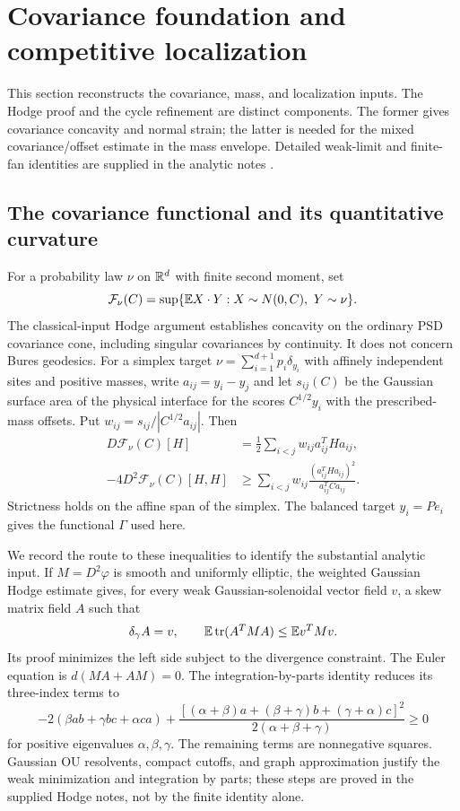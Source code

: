 \section{Covariance foundation and competitive localization}
\label{sec:foundation-proof}
This section reconstructs the covariance, mass, and localization inputs.
The Hodge proof and the cycle refinement are distinct components. The
former gives covariance concavity and normal strain; the latter is needed
for the mixed covariance/offset estimate in the mass envelope. Detailed
weak-limit and finite-fan identities are supplied in the analytic notes
\cite{hodge,cycle,currentassembly}.

\subsection{The covariance functional and its quantitative curvature}
For a probability law $\nu$ on $\mathbb R^d$ with finite second moment, set
\[
 \mathcal F_\nu(C)=\sup\{\mathbb E X\cdot Y:X\sim N(0,C),\ Y\sim\nu\}.
\]
The classical-input Hodge argument \cite{hodge} establishes concavity
on the ordinary PSD covariance cone, including singular covariances by
continuity. It does not concern Bures geodesics. For a simplex target
$\nu=\sum_{i=1}^{d+1}p_i\delta_{y_i}$ with affinely independent sites and
positive masses, write $a_{ij}=y_i-y_j$ and let $s_{ij}(C)$ be the Gaussian
surface area of the physical interface for the scores $C^{1/2}y_i$ with
the prescribed-mass offsets. Put $w_{ij}=s_{ij}/|C^{1/2}a_{ij}|$. Then
\begin{align}
 D\mathcal F_\nu(C)[H]&=\frac12\sum_{i<j}w_{ij}a_{ij}^THa_{ij},
       \label{eq:hodge-derivative}\\
 -4D^2\mathcal F_\nu(C)[H,H]
 &\ge\sum_{i<j}w_{ij}\frac{(a_{ij}^THa_{ij})^2}{a_{ij}^TCa_{ij}}.
       \label{eq:hodge-strain}
\end{align}
Strictness holds on the affine span of the simplex. The balanced target
$y_i=Pe_i$ gives the functional $\Gamma$ used here.

We record the route to these inequalities to identify the substantial
analytic input. If $M=D^2\varphi$ is smooth and uniformly elliptic, the
weighted Gaussian Hodge estimate gives, for every weak Gaussian-solenoidal
vector field $v$, a skew matrix field $A$ such that
\[
 \delta_\gamma A=v,\qquad
 \mathbb E\operatorname{tr}(A^TMA)\le\mathbb E v^TMv.
\]
Its proof minimizes the left side subject to the divergence constraint.
The Euler equation is $d(MA+AM)=0$. The integration-by-parts identity
reduces its three-index terms to
\[
 -2(\beta ab+\gamma bc+\alpha ca)
 +\frac{[(\alpha+\beta)a+(\beta+\gamma)b+(\gamma+\alpha)c]^2}
             {2(\alpha+\beta+\gamma)}\ge0
\]
for positive eigenvalues $\alpha,\beta,\gamma$. The remaining terms are
nonnegative squares. Gaussian OU resolvents, compact cutoffs, and graph
approximation justify the weak minimization and integration by parts;
these steps are proved in the supplied Hodge notes, not by the finite
identity alone.

